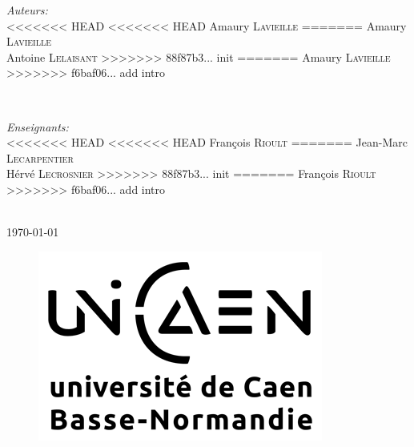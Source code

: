 \begin{titlepage}

\begin{minipage}{0.4\textwidth}
\begin{flushleft} \large
\emph{Auteurs:}\\
<<<<<<< HEAD
<<<<<<< HEAD
Amaury \textsc{Lavieille}
=======
Amaury \textsc{Lavieille}\\ %
Antoine \textsc{Lelaisant}
>>>>>>> 88f87b3... init
=======
Amaury \textsc{Lavieille}
>>>>>>> f6baf06... add intro
\end{flushleft}
\end{minipage}
~
\begin{minipage}{0.4\textwidth}
\begin{flushright} \large
\emph{Enseignants:} \\
<<<<<<< HEAD
<<<<<<< HEAD
François \textsc{Rioult}
=======
Jean-Marc \textsc{Lecarpentier}\\
Hérvé \textsc{Lecrosnier}
>>>>>>> 88f87b3... init
=======
François \textsc{Rioult}
>>>>>>> f6baf06... add intro
\end{flushright}
\end{minipage}\\[4cm]


{\large \today}\\[3cm] %



\begin{figure}[H]
    \begin{center}
      \includegraphics[scale=1]{images/LogoUnicaen}
    \end{center}
    \label{frbr-resume}
\end{figure}


\vfill %

\end{titlepage}